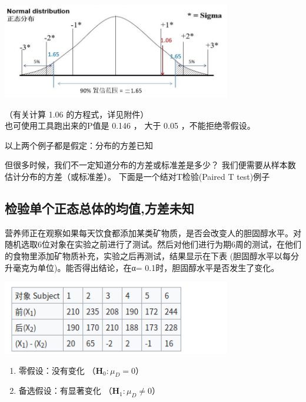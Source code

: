 
\includegraphics[width=10cm]{M4twoPopulationScreenshot_2022-09-11_201946.jpg}

（有关计算 1.06 的方程式，详见附件）\\
也可使用工具跑出来的P值是 0.146 ， 大于 0.05 ，不能拒绝零假设。

以上两个例子都是假定：分布的方差已知

但很多时候，我们不一定知道分布的方差或标准差是多少？
我们便需要从样本数估计分布的方差（或标准差）。
下面是一个结对T检验(Paired T test)例子

\hypertarget{ux68c0ux9a8cux5355ux4e2aux6b63ux6001ux603bux4f53ux7684ux5747ux503cux65b9ux5deeux672aux77e5}{%
\subsection{检验单个正态总体的均值,方差未知}\label{ux68c0ux9a8cux5355ux4e2aux6b63ux6001ux603bux4f53ux7684ux5747ux503cux65b9ux5deeux672aux77e5}}

营养师正在观察如果每天饮食都添加某类矿物质，是否会改变人的胆固醇水平。对随机选取6位对象在实验之前进行了测试。然后对他们进行为期6周的测试，在他们的食物里添加矿物质补充，实验之后再测试，结果显示在下表
(胆固醇水平以每分升毫克为单位)。能否得出结论，在α=
0.1时，胆固醇水平是否发生了变化。


\includegraphics[width=10cm]{Screenshotfrom2023-04-1622-04-35.png}

\begin{enumerate}
\tightlist
\item
  零假设：没有变化 （\(\mathbf{H}_0: \mu _D = 0\)）
\item
  备选假设：有显著变化 （\(\mathbf{H}_1: \mu _D \neq 0\)）
\end{enumerate}

